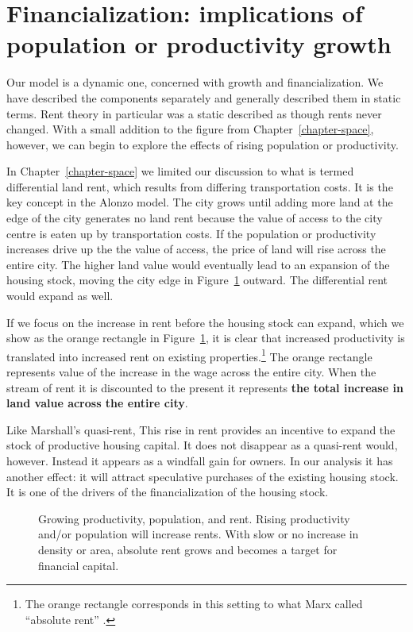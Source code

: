 \section{Financialization: implications of  population or productivity growth}

Our model is a dynamic  one, concerned with growth and financialization. We have described the components separately and  generally described them in static terms. Rent theory in  particular was a static described as though rents never changed. With a small addition to the figure from Chapter~\ref{chapter-space}, however, we can begin to explore the effects of rising population or productivity. 

In Chapter~\ref{chapter-space} we limited our discussion to what is termed differential land rent, which results from differing transportation costs. It is the key concept in the Alonzo model. The city grows until adding more land at the edge of the city generates no land rent because the value of access to the city centre is eaten up by transportation costs. If the population or productivity increases   drive up the the value of access, the price of land  will rise across the entire city. The higher land value would eventually lead to an expansion of the housing stock, moving the city edge in Figure~\ref{fig:absoluite_rent} outward. The differential rent would expand as well.

If we focus on the increase in rent before the housing stock can expand, which we show as the orange rectangle in Figure~\ref{fig:absoluite_rent}, it is clear that increased productivity is translated into increased rent on existing properties.\footnote{The orange rectangle corresponds in this setting to what Marx called ``absolute rent'' \cite{dasilvaAbsoluteRent2018}. } The orange rectangle represents value of the increase in the wage across the entire city. When the stream of rent it is discounted to the present it represents \textbf{the total increase in land value across the entire city}. 

Like Marshall's quasi-rent, This rise in rent provides an incentive to expand the stock of productive housing capital.  It does not disappear  as a quasi-rent would, however. Instead it appears as a windfall gain for owners. In our analysis it has another effect: it will attract speculative purchases of the existing housing stock. It is one of the drivers of the financialization of the housing stock. 


\begin{figure}
    \centering
    
    \caption{Growing productivity, population, and rent. Rising productivity and/or population will increase rents. With slow or no increase in density or area,  absolute rent grows and becomes a target for financial capital.  }
    \label{fig:absoluite_rent}
\end{figure}

